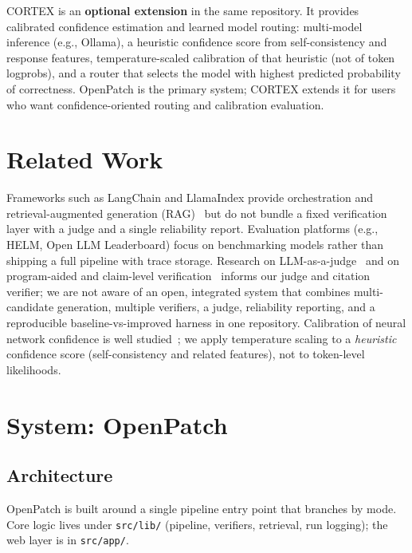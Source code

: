 \documentclass[11pt]{article}
\begin{document}
CORTEX is an \textbf{optional extension} in the same repository. It provides calibrated confidence estimation and learned model routing: multi-model inference (e.g., Ollama), a heuristic confidence score from self-consistency and response features, temperature-scaled calibration of that heuristic (not of token logprobs), and a router that selects the model with highest predicted probability of correctness. OpenPatch is the primary system; CORTEX extends it for users who want confidence-oriented routing and calibration evaluation.

\section{Related Work}
\label{sec:related}

Frameworks such as LangChain and LlamaIndex provide orchestration and retrieval-augmented generation (RAG)~\citep{lewis2020rag} but do not bundle a fixed verification layer with a judge and a single reliability report. Evaluation platforms (e.g., HELM, Open LLM Leaderboard) focus on benchmarking models rather than shipping a full pipeline with trace storage. Research on LLM-as-a-judge~\citep{zheng2023judging} and on program-aided and claim-level verification~\citep{gao2023pal} informs our judge and citation verifier; we are not aware of an open, integrated system that combines multi-candidate generation, multiple verifiers, a judge, reliability reporting, and a reproducible baseline-vs-improved harness in one repository. Calibration of neural network confidence is well studied~\citep{guo2017calibration}; we apply temperature scaling to a \emph{heuristic} confidence score (self-consistency and related features), not to token-level likelihoods.

\section{System: OpenPatch}
\label{sec:openpatch}

\subsection{Architecture}
OpenPatch is built around a single pipeline entry point that branches by mode. Core logic lives under \texttt{src/lib/} (pipeline, verifiers, retrieval, run logging); the web layer is in \texttt{src/app/}.
\end{document}
